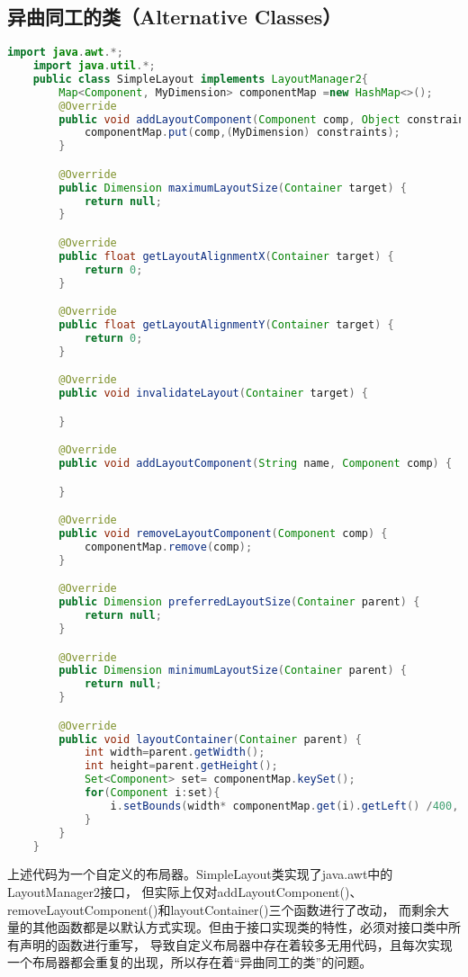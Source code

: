 \documentclass[a4paper]{article}
\begin{document}
\subsection{异曲同工的类（Alternative Classes）}
\begin{lstlisting}[language={java}]
    import java.awt.*;
    import java.util.*;
    public class SimpleLayout implements LayoutManager2{
        Map<Component, MyDimension> componentMap =new HashMap<>();
        @Override
        public void addLayoutComponent(Component comp, Object constraints) {
            componentMap.put(comp,(MyDimension) constraints);
        }

        @Override
        public Dimension maximumLayoutSize(Container target) {
            return null;
        }

        @Override
        public float getLayoutAlignmentX(Container target) {
            return 0;
        }

        @Override
        public float getLayoutAlignmentY(Container target) {
            return 0;
        }

        @Override
        public void invalidateLayout(Container target) {

        }

        @Override
        public void addLayoutComponent(String name, Component comp) {

        }

        @Override
        public void removeLayoutComponent(Component comp) {
            componentMap.remove(comp);
        }

        @Override
        public Dimension preferredLayoutSize(Container parent) {
            return null;
        }

        @Override
        public Dimension minimumLayoutSize(Container parent) {
            return null;
        }

        @Override
        public void layoutContainer(Container parent) {
            int width=parent.getWidth();
            int height=parent.getHeight();
            Set<Component> set= componentMap.keySet();
            for(Component i:set){
                i.setBounds(width* componentMap.get(i).getLeft() /400, height* componentMap.get(i).getTop() /300, componentMap.get(i).getWidth(), componentMap.get(i).getHeight());
            }
        }
    }
\end{lstlisting}

上述代码为一个自定义的布局器。SimpleLayout类实现了java.awt中的LayoutManager2接口，
但实际上仅对addLayoutComponent()、removeLayoutComponent()和layoutContainer()三个函数进行了改动，
而剩余大量的其他函数都是以默认方式实现。但由于接口实现类的特性，必须对接口类中所有声明的函数进行重写，
导致自定义布局器中存在着较多无用代码，且每次实现一个布局器都会重复的出现，所以存在着“异曲同工的类”的问题。
\end{document}
